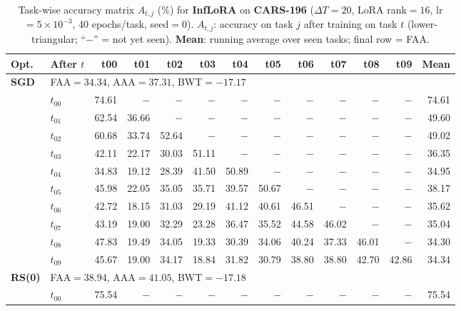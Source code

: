 \begin{table}[ht]
\centering
\caption{%
  Task-wise accuracy matrix $A_{t,j}$ (\%) for \textbf{InfLoRA} on \textbf{CARS-196} ($\Delta T=20$, LoRA rank$=16$, lr$=5\times10^{-3}$, 40 epochs/task, seed$=0$).
  $A_{t,j}$: accuracy on task $j$ after training on task $t$  (lower-triangular; ``$-$'' = not yet seen).
  \textbf{Mean}: running average over seen tasks; final row = FAA.
}
\label{tab:raw_inflora_cars196}
\setlength{\tabcolsep}{2.8pt}
\renewcommand{\arraystretch}{0.88}
\scriptsize
\begin{tabular}{@{}l l r r r r r r r r r r r@{}}
\toprule
\textbf{Opt.} & \textbf{After $t$} & \textbf{t00} & \textbf{t01} & \textbf{t02} & \textbf{t03} & \textbf{t04} & \textbf{t05} & \textbf{t06} & \textbf{t07} & \textbf{t08} & \textbf{t09} & \textbf{Mean} \\
\midrule
\multirow{11}{*}{\textbf{SGD}} & \multicolumn{12}{l}{\quad\small FAA$=34.34$,\; AAA$=37.31$,\; BWT$=-17.17$} \\
 & $t_{00}$ & 74.61 & $-$ & $-$ & $-$ & $-$ & $-$ & $-$ & $-$ & $-$ & $-$ & 74.61 \\
 & $t_{01}$ & 62.54 & 36.66 & $-$ & $-$ & $-$ & $-$ & $-$ & $-$ & $-$ & $-$ & 49.60 \\
 & $t_{02}$ & 60.68 & 33.74 & 52.64 & $-$ & $-$ & $-$ & $-$ & $-$ & $-$ & $-$ & 49.02 \\
 & $t_{03}$ & 42.11 & 22.17 & 30.03 & 51.11 & $-$ & $-$ & $-$ & $-$ & $-$ & $-$ & 36.35 \\
 & $t_{04}$ & 34.83 & 19.12 & 28.39 & 41.50 & 50.89 & $-$ & $-$ & $-$ & $-$ & $-$ & 34.95 \\
 & $t_{05}$ & 45.98 & 22.05 & 35.05 & 35.71 & 39.57 & 50.67 & $-$ & $-$ & $-$ & $-$ & 38.17 \\
 & $t_{06}$ & 42.72 & 18.15 & 31.03 & 29.19 & 41.12 & 40.61 & 46.51 & $-$ & $-$ & $-$ & 35.62 \\
 & $t_{07}$ & 43.19 & 19.00 & 32.29 & 23.28 & 36.47 & 35.52 & 44.58 & 46.02 & $-$ & $-$ & 35.04 \\
 & $t_{08}$ & 47.83 & 19.49 & 34.05 & 19.33 & 30.39 & 34.06 & 40.24 & 37.33 & 46.01 & $-$ & 34.30 \\
 & $t_{09}$ & 45.67 & 19.00 & 34.17 & 18.84 & 31.82 & 30.79 & 38.80 & 38.80 & 42.70 & 42.86 & 34.34 \\
\midrule
\multirow{11}{*}{\textbf{RS(0)}} & \multicolumn{12}{l}{\quad\small FAA$=38.94$,\; AAA$=41.05$,\; BWT$=-17.18$} \\
 & $t_{00}$ & 75.54 & $-$ & $-$ & $-$ & $-$ & $-$ & $-$ & $-$ & $-$ & $-$ & 75.54 \\

\end{tabular}
\end{table}
